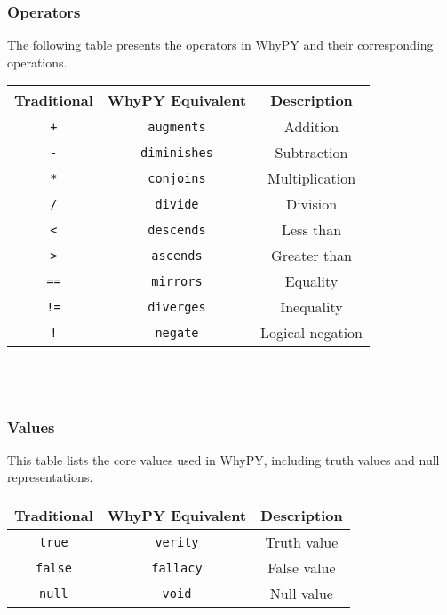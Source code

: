 \documentclass[conference]{IEEEtran}
\begin{document}
\subsubsection{Operators}
The following table presents the operators in WhyPY and their corresponding operations. \\
\par \vspace{1mm} 
\begin{tabular}{|c|c|c|}
\hline
\textbf{Traditional} & \textbf{WhyPY Equivalent} & \textbf{Description} \\
\hline
\texttt{+} & \texttt{augments} & Addition \\
\texttt{-} & \texttt{diminishes} & Subtraction \\
\texttt{*} & \texttt{conjoins} & Multiplication \\
\texttt{/} & \texttt{divide} & Division \\
\texttt{<} & \texttt{descends} & Less than \\
\texttt{>} & \texttt{ascends} & Greater than \\
\texttt{==} & \texttt{mirrors} & Equality \\
\texttt{!=} & \texttt{diverges} & Inequality \\
\texttt{!} & \texttt{negate} & Logical negation \\
\hline
\end{tabular}
\\
\\

\subsubsection{Values}
This table lists the core values used in WhyPY, including truth values and null representations. \\ 
\par \vspace{1mm} 
\begin{tabular}{|c|c|c|}
\hline
\textbf{Traditional} & \textbf{WhyPY Equivalent} & \textbf{Description} \\
\hline
\texttt{true} & \texttt{verity} & Truth value \\
\texttt{false} & \texttt{fallacy} & False value \\
\texttt{null} & \texttt{void} & Null value \\
\hline
\end{tabular}
\\
\\
\end{document}
